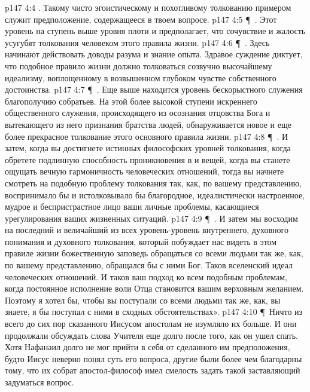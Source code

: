 \vs p147 4:4 .  Такому чисто эгоистическому и похотливому толкованию примером служит предположение, содержащееся в твоем вопросе.
\vs p147 4:5 \P\ .  Этот уровень на ступень выше уровня плоти и предполагает, что сочувствие и жалость усугубят толкования человеком этого правила жизни.
\vs p147 4:6 \P\ .  Здесь начинают действовать доводы разума и знание опыта. Здравое суждение диктует, что подобное правило жизни должно толковаться созвучно высочайшему идеализму, воплощенному в возвышенном глубоком чувстве собственного достоинства.
\vs p147 4:7 \P\ .  Еще выше находится уровень бескорыстного служения благополучию собратьев. На этой более высокой ступени искреннего общественного служения, происходящего из осознания отцовства Бога и вытекающего из него признания братства людей, обнаруживается новое и еще более прекрасное толкование этого основного правила жизни.
\vs p147 4:8 \P\ .  И затем, когда вы достигнете истинных философских уровней толкования, когда обретете подлинную способность проникновения в  и  вещей, когда вы станете ощущать вечную гармоничность человеческих отношений, тогда вы начнете смотреть на подобную проблему толкования так, как, по вашему представлению, воспринимало бы и истолковывало бы благородное, идеалистически настроенное, мудрое и беспристрастное лицо ваши личные проблемы, касающиеся урегулирования ваших жизненных ситуаций.
\vs p147 4:9 \P\ .  И затем мы восходим на последний и величайший из всех уровень\hyp{}уровень внутреннего, духовного понимания и духовного толкования, который побуждает нас видеть в этом правиле жизни божественную заповедь обращаться со всеми людьми так же, как, по вашему представлению, обращался бы с ними Бог. Таков вселенский идеал человеческих отношений. И таков ваш подход ко всем подобным проблемам, когда постоянное исполнение воли Отца становится вашим верховным желанием. Поэтому я хотел бы, чтобы вы поступали со всеми людьми так же, как, вы знаете, я бы поступал с ними в сходных обстоятельствах».
\vs p147 4:10 \P\ Ничто из всего до сих пор сказанного Иисусом апостолам не изумляло их больше. И они продолжали обсуждать слова Учителя еще долго после того, как он ушел спать. Хотя Нафанаил долго не мог прийти в себя от сделанного им предположения, будто Иисус неверно понял суть его вопроса, другие были более чем благодарны тому, что их собрат апостол\hyp{}философ имел смелость задать такой заставляющий задуматься вопрос.
